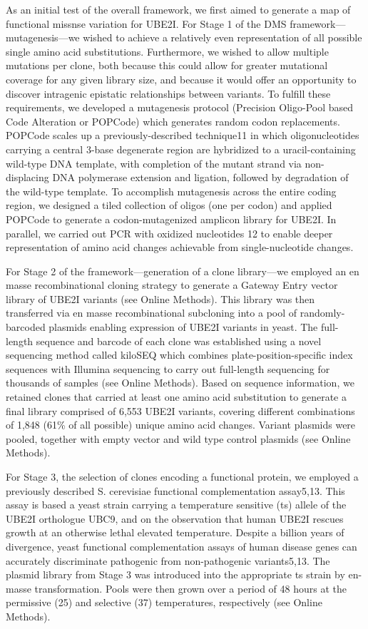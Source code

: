 As an initial test of the overall framework, we first aimed to generate a map of functional missnse variation for UBE2I. For Stage 1 of the DMS framework---mutagenesis---we wished to achieve a relatively even representation of all possible single amino acid substitutions.  Furthermore, we wished to allow multiple mutations per clone, both because this could allow for greater mutational coverage for any given library size, and because it would offer an opportunity to discover intragenic epistatic relationships between variants.  To fulfill these requirements, we developed a mutagenesis protocol (Precision Oligo-Pool based Code Alteration or POPCode) which generates random codon replacements. POPCode scales up a previously-described technique11 in which oligonucleotides carrying a central 3-base degenerate region are hybridized to a uracil-containing wild-type DNA template, with completion of the mutant strand via non-displacing DNA polymerase extension and ligation, followed by degradation of the wild-type template.  To accomplish mutagenesis across the entire coding region, we designed a tiled collection of oligos (one per codon) and applied POPCode to generate a codon-mutagenized amplicon library for UBE2I.  In parallel, we carried out PCR with oxidized nucleotides 12 to enable deeper representation of amino acid changes achievable from single-nucleotide changes.

For Stage 2 of the framework---generation of a clone library---we employed an en masse recombinational cloning strategy to generate a Gateway Entry vector library of UBE2I variants (see Online Methods). This library was then transferred via en masse recombinational subcloning into a pool of randomly-barcoded plasmids enabling expression of UBE2I variants in yeast. The full-length sequence and barcode of each clone was established using a novel sequencing method called kiloSEQ which combines plate-position-specific index sequences with Illumina sequencing to carry out full-length sequencing for thousands of samples (see Online Methods). Based on sequence information, we retained clones that carried at least one amino acid substitution to generate a final library comprised of 6,553 UBE2I variants, covering different combinations of 1,848 (61\% of all possible) unique amino acid changes. Variant plasmids were pooled, together with empty vector and wild type control plasmids (see Online Methods).

For Stage 3, the selection of clones encoding a functional protein, we employed a previously described S. cerevisiae functional complementation assay5,13. This assay is based a yeast strain carrying a temperature sensitive (ts) allele of the UBE2I orthologue UBC9, and on the observation that human UBE2I rescues growth at an otherwise lethal elevated temperature.  Despite a billion years of divergence, yeast functional complementation assays of human disease genes can accurately discriminate pathogenic from non-pathogenic variants5,13.  The plasmid library from Stage 3 was introduced into the appropriate ts strain by en-masse transformation. Pools were then grown over a period of 48 hours at the permissive (25\celsius ) and selective (37\celsius ) temperatures, respectively (see Online Methods).

